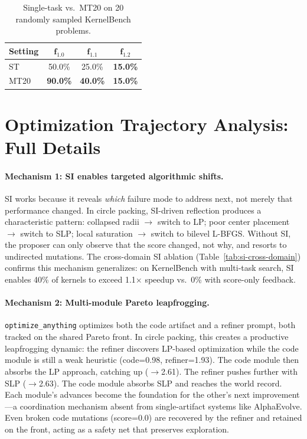 \documentclass[sigconf]{acmart}
\newcommand{\oa}{\texttt{optimize\_anything}}
\begin{document}
\begin{table}[h]
\caption{Single-task vs.\ MT20 on 20 randomly sampled KernelBench problems.}
\label{tab:mt-scaling-20}
\small
\begin{tabular}{@{}lccc@{}}
\toprule
\textbf{Setting} & $\mathbf{f_{1.0}}$ & $\mathbf{f_{1.1}}$ & $\mathbf{f_{1.2}}$ \\
\midrule
ST   & 50.0\% & 25.0\% & \textbf{15.0\%} \\
MT20 & \textbf{90.0\%} & \textbf{40.0\%} & \textbf{15.0\%} \\
\bottomrule
\end{tabular}
\end{table}

\section{Optimization Trajectory Analysis: Full Details}\label{app:trajectory-detail}

\paragraph{Mechanism 1: SI enables targeted algorithmic shifts.}
SI works because it reveals \emph{which} failure mode to address next, not merely that performance changed. In circle packing, SI-driven reflection produces a characteristic pattern: collapsed radii $\to$ switch to LP; poor center placement $\to$ switch to SLP; local saturation $\to$ switch to bilevel L-BFGS. Without SI, the proposer can only observe that the score changed, not why, and resorts to undirected mutations. The cross-domain SI ablation (Table~\ref{tab:si-cross-domain}) confirms this mechanism generalizes: on KernelBench with multi-task search, SI enables 40\% of kernels to exceed 1.1$\times$ speedup vs.\ 0\% with score-only feedback.

\paragraph{Mechanism 2: Multi-module Pareto leapfrogging.}
\oa{} optimizes both the code artifact and a refiner prompt, both tracked on the shared Pareto front. In circle packing, this creates a productive leapfrogging dynamic: the refiner discovers LP-based optimization while the code module is still a weak heuristic (code=0.98, refiner=1.93). The code module then absorbs the LP approach, catching up ($\to$2.61). The refiner pushes further with SLP ($\to$2.63). The code module absorbs SLP and reaches the world record. Each module's advances become the foundation for the other's next improvement---a coordination mechanism absent from single-artifact systems like AlphaEvolve. Even broken code mutations (score=0.0) are recovered by the refiner and retained on the front, acting as a safety net that preserves exploration.
\end{document}
